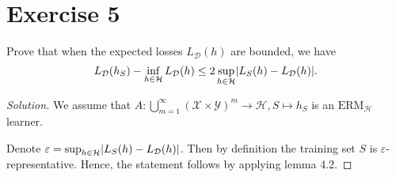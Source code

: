 \documentclass[10pt, a4paper, twoside]{amsart}
\DeclarePairedDelimiter\abs{\lvert}{\rvert}
\DeclarePairedDelimiter\cbrac\{\}
\renewcommand{\c}{\ensuremath{\colon}}
\newenvironment{solution}
               {\let\oldqedsymbol=\qedsymbol
                \renewcommand{\qedsymbol}{$\blacktriangleleft$}
                \begin{proof}[Solution]}
               {\end{proof}
                \renewcommand{\qedsymbol}{\oldqedsymbol}}
\newcommand{\TODO}{\textcolor{red}{\textbf{!!!!!! }}}
\begin{document}
\section*{Exercise 5}
Prove that when the expected losses $L_{\mathcal{D}}(h)$ are bounded, we have
\begin{equation*}
  L_{\mathcal{D}}(h_S) - \inf_{h\in \mathcal{H}}L_{\mathcal{D}}(h)
  \leq 2 \sup_{h\in \mathcal{H}}\abs{L_S(h)-L_{\mathcal{D}}(h)}.
\end{equation*}
\begin{solution}
We assume that $A:\bigcup_{m=1}^{\infty}(\mathcal{X}\times\mathcal{Y})^m \to \mathcal{H}, S \mapsto h_S$
is an $\mathrm{ERM}_{\mathcal{H}}$ learner.

Denote $\varepsilon = \sup_{h\in \mathcal{H}}\abs{L_S(h)-L_{\mathcal{D}}(h)}$.
Then by definition the training set $S$ is $\varepsilon$-representative.
Hence, the statement follows by applying lemma 4.2.


\end{solution}
\end{document}
